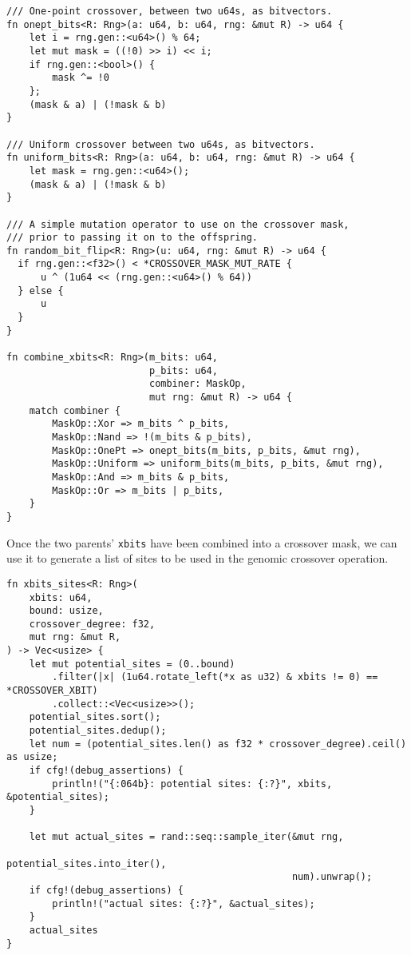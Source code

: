 \documentclass[11pt]{article}
\begin{document}
\lstset{language=rust,label=orgec3617d,caption= ,captionpos=b,numbers=none}
\begin{lstlisting}
/// One-point crossover, between two u64s, as bitvectors.
fn onept_bits<R: Rng>(a: u64, b: u64, rng: &mut R) -> u64 {
    let i = rng.gen::<u64>() % 64;
    let mut mask = ((!0) >> i) << i;
    if rng.gen::<bool>() {
        mask ^= !0
    };
    (mask & a) | (!mask & b)
}

/// Uniform crossover between two u64s, as bitvectors.
fn uniform_bits<R: Rng>(a: u64, b: u64, rng: &mut R) -> u64 {
    let mask = rng.gen::<u64>();
    (mask & a) | (!mask & b)
}

/// A simple mutation operator to use on the crossover mask,
/// prior to passing it on to the offspring.
fn random_bit_flip<R: Rng>(u: u64, rng: &mut R) -> u64 {
  if rng.gen::<f32>() < *CROSSOVER_MASK_MUT_RATE {
      u ^ (1u64 << (rng.gen::<u64>() % 64)) 
  } else {
      u
  }
}

fn combine_xbits<R: Rng>(m_bits: u64,
                         p_bits: u64,
                         combiner: MaskOp,
                         mut rng: &mut R) -> u64 {
    match combiner {
        MaskOp::Xor => m_bits ^ p_bits,
        MaskOp::Nand => !(m_bits & p_bits),
        MaskOp::OnePt => onept_bits(m_bits, p_bits, &mut rng),
        MaskOp::Uniform => uniform_bits(m_bits, p_bits, &mut rng),
        MaskOp::And => m_bits & p_bits,
        MaskOp::Or => m_bits | p_bits,
    }
}
\end{lstlisting}

Once the two parents' \texttt{xbits} have been combined into a crossover mask, we
can use it to generate a list of sites to be used in the genomic crossover
operation. 

\lstset{language=rust,label=org05132e5,caption= ,captionpos=b,numbers=none}
\begin{lstlisting}
fn xbits_sites<R: Rng>(
    xbits: u64,
    bound: usize,
    crossover_degree: f32,
    mut rng: &mut R,
) -> Vec<usize> {
    let mut potential_sites = (0..bound)
        .filter(|x| (1u64.rotate_left(*x as u32) & xbits != 0) == *CROSSOVER_XBIT)
        .collect::<Vec<usize>>();
    potential_sites.sort();
    potential_sites.dedup();
    let num = (potential_sites.len() as f32 * crossover_degree).ceil() as usize;
    if cfg!(debug_assertions) {
        println!("{:064b}: potential sites: {:?}", xbits, &potential_sites);
    }

    let mut actual_sites = rand::seq::sample_iter(&mut rng,
                                                  potential_sites.into_iter(), 
                                                  num).unwrap();
    if cfg!(debug_assertions) {
        println!("actual sites: {:?}", &actual_sites);
    }
    actual_sites
}
\end{lstlisting}
\end{document}
